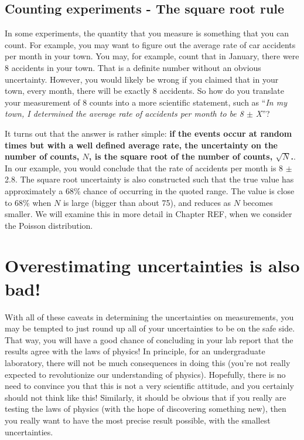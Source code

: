 \subsection{Counting experiments - The square root rule}
\label{sec:countingError}
In some experiments, the quantity that you measure is something that you can count. For example, you may want to figure out the average rate of car accidents per month in your town. You may, for example, count that in January, there were 8 accidents in your town. That is a definite number without an obvious uncertainty. However, you would likely be wrong if you claimed that in your town, every month, there will be exactly 8 accidents. So how do you translate your measurement of 8 counts into a more scientific statement, such as ``\textit{In my town, I determined the average rate of accidents per month to be 8 $\pm$ X}''? 

It turns out that the answer is rather simple: \textbf{if the events occur at random times but with a well defined average rate, the uncertainty on the number of counts, $N$, is the square root of the number of counts, $\sqrt{N}$.}. In our example, you would conclude that the rate of accidents per month is 8 $\pm$ 2.8. The square root uncertainty is also constructed such that the true value has approximately a 68\% chance of occurring in the quoted range. The value is close to 68\% when $N$ is large (bigger than about 75), and reduces as $N$ becomes smaller. We will examine this in more detail in Chapter REF, when we consider the Poisson distribution.

\section{Overestimating uncertainties is also bad!}
With all of these caveats in determining the uncertainties on measurements, you may be tempted to just round up all of your uncertainties to be on the safe side. That way, you will have a good chance of concluding in your lab report that the results agree with the laws of physics! In principle, for an undergraduate laboratory, there will not be much consequences in doing this (you're not really expected to revolutionize our understanding of physics). Hopefully, there is no need to convince you that this is not a very scientific attitude, and you certainly should not think like this! Similarly, it should be obvious that if you really are testing the laws of physics (with the hope of discovering something new), then you really want to have the most precise result possible, with the smallest uncertainties.

